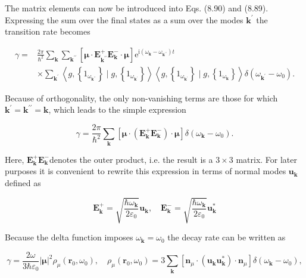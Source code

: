 \documentclass[10pt]{article}
\begin{document}
The matrix elements can now be introduced into Eqs. (8.90) and (8.89). Expressing the sum over the final states as a sum over the modes $\mathbf{k}^{\prime}$ the transition rate becomes


\begin{align*}
\gamma= & \frac{2 \pi}{\hbar^{2}} \sum_{\mathbf{k}} \sum_{\mathbf{k}^{\prime \prime}}\left[\boldsymbol{\mu} \cdot \mathbf{E}_{\mathbf{k}^{\prime \prime}}^{+} \mathbf{E}_{\mathbf{k}}^{-} \cdot \boldsymbol{\mu}\right] \mathrm{e}^{\mathrm{i}\left(\omega_{\mathbf{k}}-\omega_{\mathbf{k}^{\prime \prime}}\right) t}  \tag{8.100}\\
& \times \sum_{\mathbf{k}^{\prime}}\left\langle g,\left\{1_{\omega_{\mathbf{k}^{\prime \prime}}}\right\} \mid g,\left\{1_{\omega_{\mathbf{k}^{\prime}}}\right\}\right\rangle\left\langle g,\left\{1_{\omega_{\mathbf{k}^{\prime}}}\right\} \mid g,\left\{1_{\omega_{\mathbf{k}}}\right\}\right\rangle \delta\left(\omega_{\mathbf{k}^{\prime}}-\omega_{0}\right) .
\end{align*}


Because of orthogonality, the only non-vanishing terms are those for which $\mathbf{k}^{\prime}= \mathbf{k}^{\prime \prime}=\mathbf{k}$, which leads to the simple expression


\begin{equation*}
\gamma=\frac{2 \pi}{\hbar^{2}} \sum_{\mathbf{k}}\left[\boldsymbol{\mu} \cdot\left(\mathbf{E}_{\mathbf{k}}^{+} \mathbf{E}_{\mathbf{k}}^{-}\right) \cdot \boldsymbol{\mu}\right] \delta\left(\omega_{\mathbf{k}}-\omega_{0}\right) . \tag{8.101}
\end{equation*}


Here, $\mathbf{E}_{\mathbf{k}}^{+} \mathbf{E}_{\mathbf{k}}^{-}$denotes the outer product, i.e. the result is a $3 \times 3$ matrix. For later purposes it is convenient to rewrite this expression in terms of normal modes $\mathbf{u}_{\mathbf{k}}$ defined as


\begin{equation*}
\mathbf{E}_{\mathbf{k}}^{+}=\sqrt{\frac{\hbar \omega_{\mathbf{k}}}{2 \varepsilon_{0}}} \mathbf{u}_{\mathbf{k}}, \quad \mathbf{E}_{\mathbf{k}}^{-}=\sqrt{\frac{\hbar \omega_{\mathbf{k}}}{2 \varepsilon_{0}}} \mathbf{u}_{\mathbf{k}}^{*} \tag{8.102}
\end{equation*}


Because the delta function imposes $\omega_{\mathbf{k}}=\omega_{0}$ the decay rate can be written as


\begin{equation*}
\gamma=\frac{2 \omega}{3 \hbar \varepsilon_{0}}|\boldsymbol{\mu}|^{2} \rho_{\mu}\left(\mathbf{r}_{0}, \omega_{0}\right), \quad \rho_{\mu}\left(\mathbf{r}_{0}, \omega_{0}\right)=3 \sum_{\mathbf{k}}\left[\mathbf{n}_{\mu} \cdot\left(\mathbf{u}_{\mathbf{k}} \mathbf{u}_{\mathbf{k}}^{*}\right) \cdot \mathbf{n}_{\mu}\right] \delta\left(\omega_{\mathbf{k}}-\omega_{0}\right), \tag{8.103}
\end{equation*}
\end{document}
